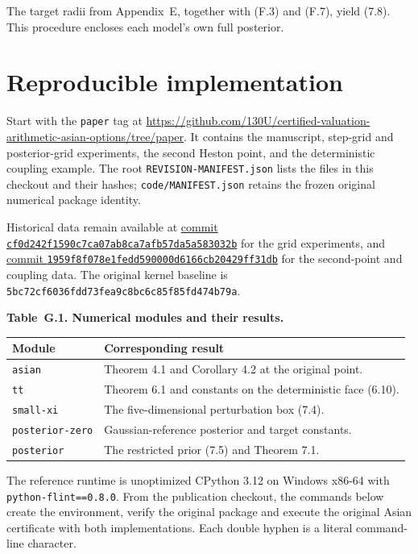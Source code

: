 The target radii from Appendix~E, together with (F.3) and (F.7), yield (7.8).
This procedure encloses each model's own full posterior.

\section{Reproducible implementation}

Start with the \texttt{paper} tag at
\url{https://github.com/130U/certified-valuation-arithmetic-asian-options/tree/paper}.
It contains the manuscript, step-grid and posterior-grid experiments, the second
Heston point, and the deterministic coupling example. The root
\texttt{REVISION-MANIFEST.json} lists the files in this checkout and their hashes;
\texttt{code/MANIFEST.json} retains the frozen original numerical package identity.

Historical data remain available at
\href{https://github.com/130U/certified-valuation-arithmetic-asian-options/tree/cf0d242f1590c7ca07ab8ca7afb57da5a583032b}{commit \texttt{cf0d242f1590c7ca07ab8ca7afb57da5a583032b}}
for the grid experiments, and
\href{https://github.com/130U/certified-valuation-arithmetic-asian-options/tree/1959f8f078e1fedd590000d6166cb20429ff31db}{commit \texttt{1959f8f078e1fedd590000d6166cb20429ff31db}}
for the second-point and coupling data. The original kernel baseline is
\texttt{5bc72cf6036fdd73fea9c8bc6c85f85fd474b79a}.

\noindent\textbf{Table~G.1. Numerical modules and their results.}
\begin{center}
\begin{tabularx}{\textwidth}{@{}l X@{}}
\toprule
Module & Corresponding result \\
\midrule
\texttt{asian} & Theorem 4.1 and Corollary 4.2 at the original point. \\
\texttt{tt} & Theorem 6.1 and constants on the deterministic face (6.10). \\
\texttt{small-xi} & The five-dimensional perturbation box (7.4). \\
\texttt{posterior-zero} & Gaussian-reference posterior and target constants. \\
\texttt{posterior} & The restricted prior (7.5) and Theorem 7.1. \\
\bottomrule
\end{tabularx}
\end{center}

The reference runtime is unoptimized CPython 3.12 on Windows x86-64 with
\texttt{python-flint==0.8.0}. From the publication checkout, the commands
below create the environment, verify the original package and execute the original
Asian certificate with both implementations. Each double hyphen is a literal
command-line character.

